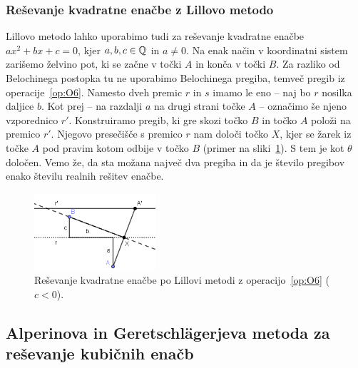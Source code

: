 
\subsubsection{Reševanje kvadratne enačbe z Lillovo metodo}
\label{podpodl:kvadr_en_lill}

Lillovo metodo lahko uporabimo tudi za reševanje kvadratne enačbe $a x^2 + b x + c = 0$, kjer $a, b, c \in \mathbb Q$ in $a \neq 0$. Na enak način v koordinatni sistem zarišemo želvino pot, ki se začne v točki $A$ in konča v točki $B$. Za razliko od Belochinega postopka tu ne uporabimo Belochinega pregiba, temveč pregib iz operacije~\ref{op:O6}. Namesto dveh premic $r$ in $s$ imamo le eno -- naj bo $r$ nosilka daljice $b$. Kot prej -- na razdalji $a$ na drugi strani točke $A$ -- označimo še njeno vzporednico $r'$. Konstruiramo pregib, ki gre skozi točko $B$ in točko $A$ položi na premico $r'$. Njegovo presečišče s premico $r$ nam določi točko $X$, kjer se žarek iz točke $A$ pod pravim kotom odbije v točko $B$ (primer na sliki~\ref{fig:kv_en_lill}). S tem je kot $\theta$ določen. Vemo že, da sta možana največ dva pregiba in da je število pregibov enako številu realnih rešitev enačbe.

\begin{figure}[h]
    \centering
    \includegraphics[width=0.4\textwidth]{images/kvadratna_enacba/kvadratna_enacba_lillova_metoda.png}
    \caption[Lillova metoda za kvadratno enačbo]{Reševanje kvadratne enačbe po Lillovi metodi z operacijo~\ref{op:O6} ($c < 0$).}
    \label{fig:kv_en_lill}
\end{figure}


\subsection{Alperinova in Geretschlägerjeva metoda za reševanje kubičnih enačb}
\label{podpogl:alperin}

